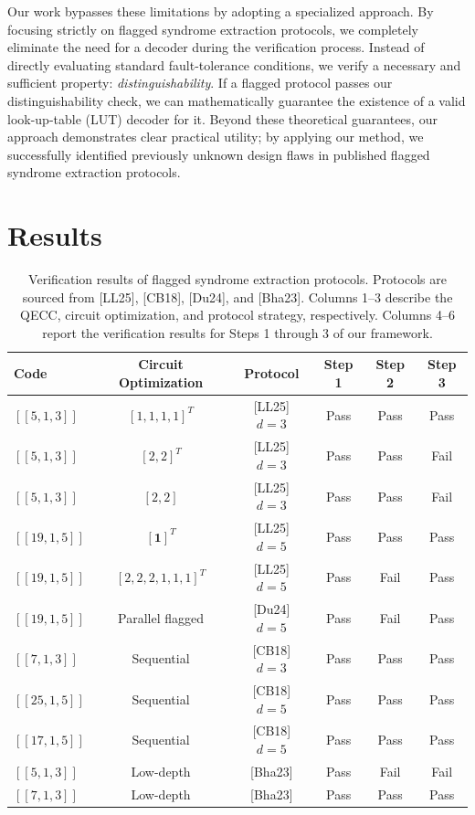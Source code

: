 \documentclass[acmsmallw,review]{acmart}
\begin{document}
Our work bypasses these limitations by adopting a specialized approach. By focusing strictly on flagged syndrome extraction protocols, we completely eliminate the need for a decoder during the verification process. Instead of directly evaluating standard fault-tolerance conditions, we verify a necessary and sufficient property: \emph{distinguishability}. If a flagged protocol passes our distinguishability check, we can mathematically guarantee the existence of a valid look-up-table (LUT) decoder for it. Beyond these theoretical guarantees, our approach demonstrates clear practical utility; by applying our method, we successfully identified previously unknown design flaws in published flagged syndrome extraction protocols.

\section{Results}
\begin{table}[htbp]
\centering
\begin{tabular}{lccccc}
\toprule
Code & Circuit Optimization & Protocol & Step 1 & Step 2 & Step 3 \\
\midrule
$[[5,1,3]]$  & $[1,1,1,1]^{T}$           & [LL25] $d=3$ & Pass & Pass & Pass \\
$[[5,1,3]]$  & $[2,2]^{T}$               & [LL25] $d=3$ & Pass & Pass & Fail \\
$[[5,1,3]]$  & $[2,2]$                   & [LL25] $d=3$ & Pass & Pass & Fail \\
$[[19,1,5]]$ & $\mathbf{[1]}^T$          & [LL25] $d=5$ & Pass & Pass & Pass \\
$[[19,1,5]]$ & $[2,2,2,1,1,1]^{T}$       & [LL25] $d=5$ & Pass & Fail & Pass \\
$[[19,1,5]]$ & Parallel flagged          & [Du24] $d=5$ & Pass & Fail & Pass \\
$[[7,1,3]]$  & Sequential                & [CB18] $d=3$ & Pass & Pass & Pass \\

$[[25,1,5]]$ & Sequential                & [CB18] $d=5$ & Pass & Pass & Pass \\
$[[17,1,5]]$ & Sequential                & [CB18] $d=5$ & Pass & Pass & Pass \\
$[[5,1,3]]$  & Low-depth                 & [Bha23]      & Pass & Fail & Fail \\
$[[7,1,3]]$  & Low-depth                 & [Bha23]      & Pass & Pass & Pass \\
\bottomrule
\end{tabular}
\caption{Verification results of flagged syndrome extraction protocols. Protocols are sourced from \cite{Liou25} [LL25], \cite{CB18} [CB18], \cite{Du24} [Du24], and \cite{low-depth} [Bha23]. Columns 1--3 describe the QECC, circuit optimization, and protocol strategy, respectively. Columns 4--6 report the verification results for Steps 1 through 3 of our framework.}\label{tab:experiment-results}
\end{table}
\end{document}
